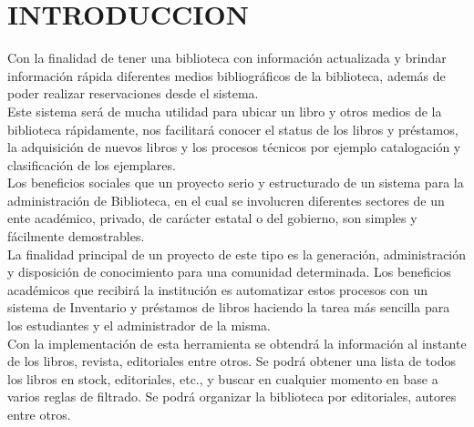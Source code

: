 \section{INTRODUCCION} 


Con la finalidad de tener una biblioteca con información actualizada y brindar información rápida diferentes medios bibliográficos de la biblioteca, además de poder realizar reservaciones desde el sistema.
\\
Este sistema será de mucha utilidad para ubicar un libro y otros medios de la biblioteca rápidamente, nos facilitará conocer el status de los libros y préstamos, la adquisición de nuevos libros y los procesos técnicos por ejemplo catalogación y clasificación de los ejemplares.
\\

Los beneficios sociales que un proyecto serio y estructurado de un sistema para la administración de Biblioteca, en el cual se involucren diferentes sectores de un ente académico, privado, de carácter estatal o del gobierno, son simples y fácilmente demostrables.\\

La finalidad principal de un proyecto de este tipo es la generación, administración y disposición de conocimiento para una comunidad determinada.
Los beneficios académicos que recibirá la institución es automatizar estos procesos con un sistema de Inventario y préstamos de libros haciendo la tarea más sencilla para los estudiantes y el administrador de la misma.\\
Con la implementación de esta herramienta se obtendrá la información al instante de los libros, revista, editoriales entre otros. Se podrá obtener una lista de todos los libros en stock, editoriales, etc., y buscar en cualquier momento en base a varios reglas de filtrado. Se podrá organizar la biblioteca por editoriales, autores entre otros.
